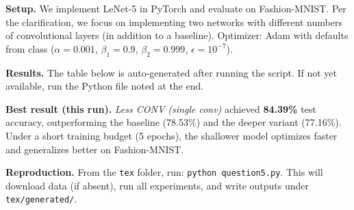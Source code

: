 \textbf{Setup.} We implement LeNet-5 in PyTorch and evaluate on Fashion-MNIST. Per the clarification, we focus on implementing two networks with different numbers of convolutional layers (in addition to a baseline). Optimizer: Adam with defaults from class (\(\alpha{=}0.001\), \(\beta_1{=}0.9\), \(\beta_2{=}0.999\), \(\epsilon{=}10^{-7}\)).

\textbf{Results.} The table below is auto-generated after running the script. If not yet available, run the Python file noted at the end.

\medskip
\noindent{}

\medskip
\textbf{Best result (this run).} \emph{Less CONV (single conv)} achieved \textbf{84.39\%} test accuracy, outperforming the baseline (78.53\%) and the deeper variant (77.16\%). Under a short training budget (5 epochs), the shallower model optimizes faster and generalizes better on Fashion-MNIST.

\medskip
\textbf{Reproduction.} From the \texttt{tex} folder, run: \texttt{python question5.py}. This will download data (if absent), run all experiments, and write outputs under \texttt{tex/generated/}.
